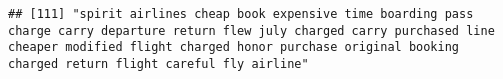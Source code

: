 \documentclass[
]{article}
\begin{document}
\begin{verbatim}
## [111] "spirit airlines cheap book expensive time boarding pass charge carry departure return flew july charged carry purchased line cheaper modified flight charged honor purchase original booking charged return flight careful fly airline"                                                                                                                                                                                                                                                                                                                                                                                                                                                                                                                                                                                                                                                                                                                                                                                                                                                                                                                                                                                                                                                                                                                                                                                                                                                                                                                                                                                                                                                                                                                                                        

\end{verbatim}
\end{document}
